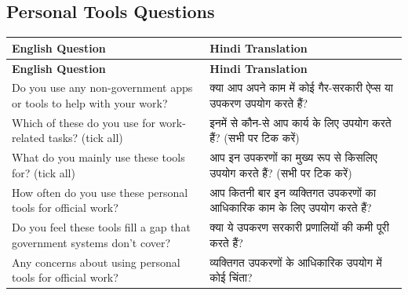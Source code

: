 \documentclass[11pt,a4paper]{article}
\begin{document}
\subsection{Personal Tools Questions}
\begin{longtable}{|p{6cm}|p{6cm}|}
\hline
\textbf{English Question} & \textbf{Hindi Translation} \\ \hline
\endfirsthead
\hline
\textbf{English Question} & \textbf{Hindi Translation} \\ \hline
\endhead
\hline
\endfoot
\hline
\endlastfoot
Do you use any non-government apps or tools to help with your work? & क्या आप अपने काम में कोई गैर-सरकारी ऐप्स या उपकरण उपयोग करते हैं? \\ \hline
Which of these do you use for work-related tasks? (tick all) & इनमें से कौन-से आप कार्य के लिए उपयोग करते हैं? (सभी पर टिक करें) \\ \hline
What do you mainly use these tools for? (tick all) & आप इन उपकरणों का मुख्य रूप से किसलिए उपयोग करते हैं? (सभी पर टिक करें) \\ \hline
How often do you use these personal tools for official work? & आप कितनी बार इन व्यक्तिगत उपकरणों का आधिकारिक काम के लिए उपयोग करते हैं? \\ \hline
Do you feel these tools fill a gap that government systems don't cover? & क्या ये उपकरण सरकारी प्रणालियों की कमी पूरी करते हैं? \\ \hline
Any concerns about using personal tools for official work? & व्यक्तिगत उपकरणों के आधिकारिक उपयोग में कोई चिंता? \\ \hline
\end{longtable}
\end{document}

